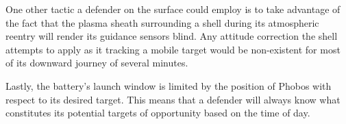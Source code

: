 One other tactic a defender on the surface could employ is to take advantage of the fact that the plasma sheath surrounding a shell during its atmospheric reentry will render its guidance sensors blind. Any attitude correction the shell attempts to apply as it tracking a mobile target would be non-existent for most of its downward journey of several minutes.

Lastly, the battery's launch window is limited by the position of Phobos with respect to its desired target. This means that a defender will always know what constitutes its potential targets of opportunity based on the time of day.

